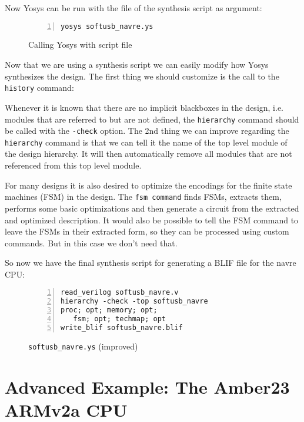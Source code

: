 Now Yosys can be run with the file of the synthesis script as argument:

\begin{figure}[H]
\begin{lstlisting}[frame=trBL,xleftmargin=1.5em,numbers=left]
yosys softusb_navre.ys
\end{lstlisting}
 \renewcommand{\figurename}{Listing}
\caption{Calling Yosys with script file}
\end{figure}

\medskip

Now that we are using a synthesis script we can easily modify how Yosys
synthesizes the design. The first thing we should customize is the
call to the {\tt history} command:

Whenever it is known that there are no implicit blackboxes in the design, i.e.
modules that are referred to but are not defined, the {\tt hierarchy} command
should be called with the {\tt -check} option. The 2nd thing we can improve
regarding the {\tt hierarchy} command is that we can tell it the name of the
top level module of the design hierarchy. It will then automatically remove
all modules that are not referenced from this top level module.

\medskip

For many designs it is also desired to optimize the encodings for the finite
state machines (FSM) in the design. The {\tt fsm command} finds FSMs, extracts
them, performs some basic optimizations and then generate a circuit from
the extracted and optimized description. It would also be possible to tell
the FSM command to leave the FSMs in their extracted form, so they can be
processed using custom commands. But in this case we don't need that.

\medskip

So now we have the final synthesis script for generating a BLIF file
for the navre CPU:

\begin{figure}[H]
\begin{lstlisting}[frame=trBL,xleftmargin=1.5em,numbers=left]
read_verilog softusb_navre.v
hierarchy -check -top softusb_navre
proc; opt; memory; opt;
   fsm; opt; techmap; opt
write_blif softusb_navre.blif
\end{lstlisting}
 \renewcommand{\figurename}{Listing}
\caption{{\tt softusb\_navre.ys} (improved)}
\end{figure}

\section{Advanced Example: The Amber23 ARMv2a CPU}

